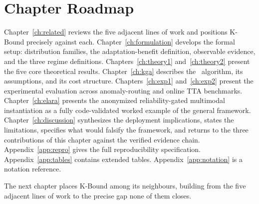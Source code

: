 \section{Chapter Roadmap}\label{sec:intro-roadmap}

Chapter~\ref{ch:related} reviews the five adjacent lines of work and
positions K-Bound precisely against each.
Chapter~\ref{ch:formulation} develops the formal setup: distribution
families, the adaptation-benefit definition, observable evidence, and the
three regime definitions.
Chapters~\ref{ch:theory1} and~\ref{ch:theory2} present the five core
theoretical results.
Chapter~\ref{ch:kga} describes the \KGA\ algorithm, its assumptions, and
its cost structure.
Chapters~\ref{ch:exp1} and~\ref{ch:exp2} present the experimental
evaluation across anomaly-routing and online TTA benchmarks.
Chapter~\ref{ch:elara} presents the anonymized reliability-gated multimodal
instantiation as a fully code-validated worked example of the general
framework.
Chapter~\ref{ch:discussion} synthesizes the deployment implications,
states the limitations, specifies what would falsify the framework, and
returns to the three contributions of this chapter against the verified
evidence chain.
Appendix~\ref{app:repro} gives the full reproducibility specification.
Appendix~\ref{app:tables} contains extended tables.
Appendix~\ref{app:notation} is a notation reference.

The next chapter places K-Bound among its neighbours, building from the five
adjacent lines of work to the precise gap none of them closes.
